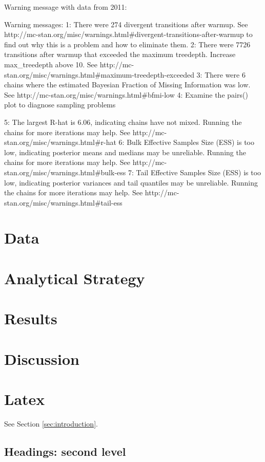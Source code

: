 \documentclass{article}
\begin{document}
Warning message with data from 2011:

Warning messages:
1: There were 274 divergent transitions after warmup. See
http://mc-stan.org/misc/warnings.html#divergent-transitions-after-warmup
to find out why this is a problem and how to eliminate them.
2: There were 7726 transitions after warmup that exceeded the maximum treedepth. Increase max_treedepth above 10. See
http://mc-stan.org/misc/warnings.html#maximum-treedepth-exceeded
3: There were 6 chains where the estimated Bayesian Fraction of Missing Information was low. See
http://mc-stan.org/misc/warnings.html#bfmi-low
4: Examine the pairs() plot to diagnose sampling problems
  
5: The largest R-hat is 6.06, indicating chains have not mixed.
Running the chains for more iterations may help. See
http://mc-stan.org/misc/warnings.html#r-hat
6: Bulk Effective Samples Size (ESS) is too low, indicating posterior means and medians may be unreliable.
Running the chains for more iterations may help. See
http://mc-stan.org/misc/warnings.html#bulk-ess
7: Tail Effective Samples Size (ESS) is too low, indicating posterior variances and tail quantiles may be unreliable.
Running the chains for more iterations may help. See
http://mc-stan.org/misc/warnings.html#tail-ess

\section{Data}\label{sec:data}

\section{Analytical Strategy}\label{sec:strategy}

\section{Results}\label{sec:results}

\section{Discussion}\label{sec:discussion}

\section{Latex}
See Section \ref{sec:introduction}.

\subsection{Headings: second level}
\end{document}
